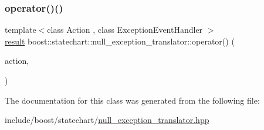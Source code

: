 \subsubsection{\texorpdfstring{operator()()}{operator()()}}
{\footnotesize\ttfamily template$<$class Action , class Exception\+Event\+Handler $>$ \\
\mbox{\hyperlink{namespaceboost_1_1statechart_abe807f6598b614d6d87bb951ecd92331}{result}} boost\+::statechart\+::null\+\_\+exception\+\_\+translator\+::operator() (\begin{DoxyParamCaption}\item[{\mbox{\hyperlink{_transition_test_8cpp_a0702b01a6272fb248401c96dd3528cec}{Action}}}]{action,  }\item[{Exception\+Event\+Handler}]{ }\end{DoxyParamCaption})\hspace{0.3cm}{\ttfamily [inline]}}



The documentation for this class was generated from the following file\+:\begin{DoxyCompactItemize}
\item 
include/boost/statechart/\mbox{\hyperlink{null__exception__translator_8hpp}{null\+\_\+exception\+\_\+translator.\+hpp}}\end{DoxyCompactItemize}
